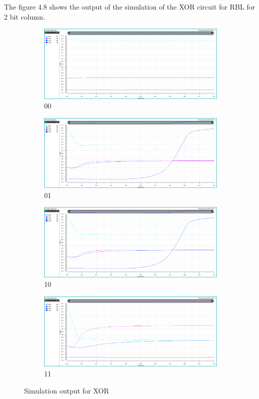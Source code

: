 The figure 4.8 shows the output of the simulation of the XOR circuit for RBL for 2 bit column.
\begin{figure}[H]
\begin{center}
\begin{subfigure}{0.4\textwidth}
\includegraphics[width=\textwidth]{xor00.png}
\caption{00}
\end{subfigure}
\begin{subfigure}{0.4\textwidth}
\includegraphics[width=\textwidth]{xor01.png}
\caption{01}
\end{subfigure}
\begin{subfigure}{0.4\textwidth}
\includegraphics[width=\textwidth]{xor10.png}
\caption{10}
\end{subfigure}
\begin{subfigure}{0.4\textwidth}
\includegraphics[width=\textwidth]{xor11.png}
\caption{11}
\end{subfigure}
\end{center}
\caption{Simulation output for XOR }

\end{figure}


